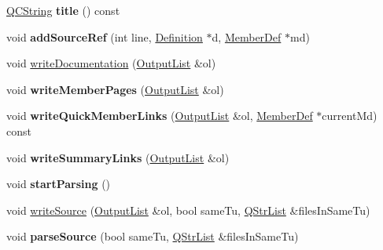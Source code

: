 \begin{DoxyCompactItemize}
\item 
\hypertarget{class_file_def_adf5241b59706e696c508de8baa4c2f97}{\hyperlink{class_q_c_string}{Q\-C\-String} {\bfseries title} () const }\label{class_file_def_adf5241b59706e696c508de8baa4c2f97}

\item 
\hypertarget{class_file_def_aed62fab5156232f7baf284f7cc5bedd5}{void {\bfseries add\-Source\-Ref} (int line, \hyperlink{class_definition}{Definition} $\ast$d, \hyperlink{class_member_def}{Member\-Def} $\ast$md)}\label{class_file_def_aed62fab5156232f7baf284f7cc5bedd5}

\item 
void \hyperlink{class_file_def_a0c85f3695c99f7b1aeb762bbdabc8d62}{write\-Documentation} (\hyperlink{class_output_list}{Output\-List} \&ol)
\item 
\hypertarget{class_file_def_a3ab9294ac3e907a42b200665010f9381}{void {\bfseries write\-Member\-Pages} (\hyperlink{class_output_list}{Output\-List} \&ol)}\label{class_file_def_a3ab9294ac3e907a42b200665010f9381}

\item 
\hypertarget{class_file_def_a17f78962f99b43ea249eb44b0ae0a8d2}{void {\bfseries write\-Quick\-Member\-Links} (\hyperlink{class_output_list}{Output\-List} \&ol, \hyperlink{class_member_def}{Member\-Def} $\ast$current\-Md) const }\label{class_file_def_a17f78962f99b43ea249eb44b0ae0a8d2}

\item 
\hypertarget{class_file_def_a237e7cf83c23d0d5ac812e3c37800a3f}{void {\bfseries write\-Summary\-Links} (\hyperlink{class_output_list}{Output\-List} \&ol)}\label{class_file_def_a237e7cf83c23d0d5ac812e3c37800a3f}

\item 
\hypertarget{class_file_def_ae699eb51d713ac53014a6c57b771757d}{void {\bfseries start\-Parsing} ()}\label{class_file_def_ae699eb51d713ac53014a6c57b771757d}

\item 
void \hyperlink{class_file_def_a2e1a2d2a95a8a49fd2537f9b05fbc296}{write\-Source} (\hyperlink{class_output_list}{Output\-List} \&ol, bool same\-Tu, \hyperlink{class_q_str_list}{Q\-Str\-List} \&files\-In\-Same\-Tu)
\item 
\hypertarget{class_file_def_a487963228800e21986055bc85cfc7fc0}{void {\bfseries parse\-Source} (bool same\-Tu, \hyperlink{class_q_str_list}{Q\-Str\-List} \&files\-In\-Same\-Tu)}\label{class_file_def_a487963228800e21986055bc85cfc7fc0}


\end{DoxyCompactItemize}
